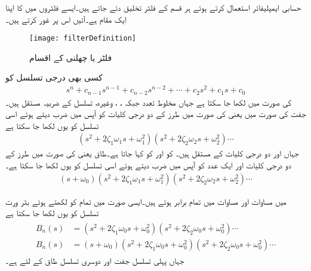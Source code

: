 حسابی ایمپلیفائر استعمال کرتے ہوئے ہر قسم کے فلٹر تخلیق دئے جاتے ہیں۔ایسے فلٹروں میں  کا اپنا ایک مقام ہے۔آئیں اس پر غور کرتے ہیں۔ 
\begin{figure}
\centering
\texttt{[image: filterDefinition]}
\caption{فلٹر یا چھلنی کے اقسام}
\label{شکل_تعددی_ردعمل_فلٹر_اقسام}
\end{figure}
%
کسی بھی  درجی تسلسل کو
\begin{align*}
s^n+c_{n-1} s^{n-1}+c_{n-2} s^{n-2}+\cdots+c_2 s^2+c_1 s+c_0
\end{align*}
کی صورت میں لکھا جا سکتا ہے جہاں  مخلوط تعدد جبکہ ، ،  وغیرہ، تسلسل کے ضربیہ مستقل ہیں۔جفت  کی صورت میں یعنی  کی صورت میں  
  طرز کے  دو درجی کلیات کو آپس میں ضرب دیتے ہوئے اسی تسلسل کو یوں لکھا جا سکتا ہے
\begin{align}\label{مساوات_تعددی_ردعمل_جفت_تسلسل}
\left(s^2+2 \zeta_1 \omega_1 s+\omega_1^2 \right)\left(s^2+2 \zeta_2 \omega_2 s+\omega_2^2 \right) \cdots
\end{align}
جہاں  اور  دو درجی کلیات    کے مستقل ہیں۔ کو  اور  کو  کہا جاتا ہے۔طاق  یعنی  کی صورت میں
  طرز کے  دو درجی کلیات اور ایک عدد  کو آپس میں ضرب دیتے ہوئے اسی تسلسل کو یوں لکھا جا سکتا ہے۔
\begin{align}\label{مساوات_تعددی_ردعمل_طاق_تسلسل}
\left(s+\omega_0 \right)\left(s^2+2 \zeta_1 \omega_1 s+\omega_1^2 \right)\left(s^2+2 \zeta_2 \omega_2 s+\omega_2^2 \right) \cdots
\end{align}

  میں مساوات  اور مساوات  میں تمام  برابر ہوتے ہیں۔ایسی صورت میں تمام  کو  لکھتے ہوئے بٹر ورت تسلسل کو یوں لکھا جا سکتا ہے
\begin{gather}
\begin{aligned}\label{مساوات_تعددی_ردعمل_بٹرورت_تسلسل}
B_n(s)&=\left(s^2+2 \zeta_1 \omega_0 s+\omega_0^2 \right)\left(s^2+2 \zeta_2 \omega_0 s+\omega_0^2 \right) \cdots\\
B_n(s)&=\left(s+\omega_0 \right)\left(s^2+2 \zeta_1 \omega_0 s+\omega_0^2 \right)\left(s^2+2 \zeta_2 \omega_0 s+\omega_0^2 \right) \cdots
\end{aligned}
\end{gather}
جہاں پہلی تسلسل جفت  اور دوسری تسلسل طاق  کے لئے ہے۔

